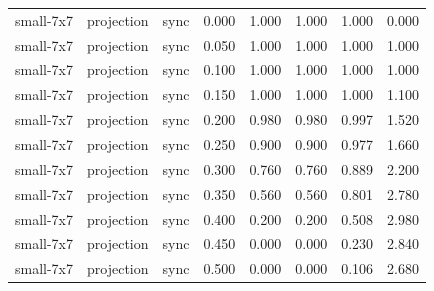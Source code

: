 \begin{tabular}{lllrrrrr}
small-7x7 & projection & sync & 0.000 & 1.000 & 1.000 & 1.000 & 0.000 \\
small-7x7 & projection & sync & 0.050 & 1.000 & 1.000 & 1.000 & 1.000 \\
small-7x7 & projection & sync & 0.100 & 1.000 & 1.000 & 1.000 & 1.000 \\
small-7x7 & projection & sync & 0.150 & 1.000 & 1.000 & 1.000 & 1.100 \\
small-7x7 & projection & sync & 0.200 & 0.980 & 0.980 & 0.997 & 1.520 \\
small-7x7 & projection & sync & 0.250 & 0.900 & 0.900 & 0.977 & 1.660 \\
small-7x7 & projection & sync & 0.300 & 0.760 & 0.760 & 0.889 & 2.200 \\
small-7x7 & projection & sync & 0.350 & 0.560 & 0.560 & 0.801 & 2.780 \\
small-7x7 & projection & sync & 0.400 & 0.200 & 0.200 & 0.508 & 2.980 \\
small-7x7 & projection & sync & 0.450 & 0.000 & 0.000 & 0.230 & 2.840 \\
small-7x7 & projection & sync & 0.500 & 0.000 & 0.000 & 0.106 & 2.680 \\
\bottomrule
\end{tabular}
